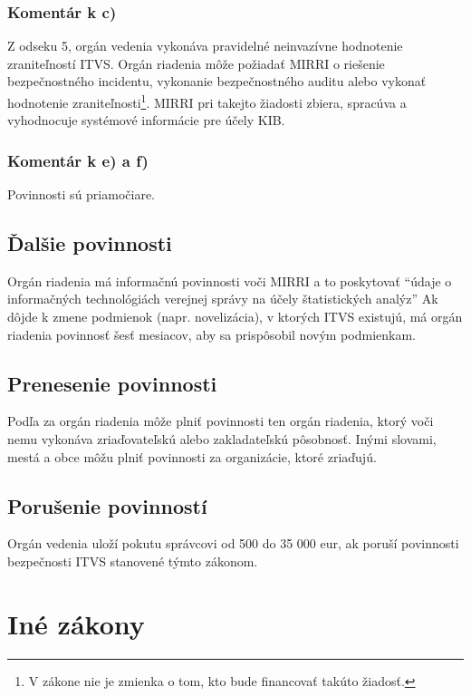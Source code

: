 \subsubsection*{Komentár k c)}
Z odseku 5, orgán vedenia vykonáva pravidelné neinvazívne hodnotenie zraniteľností \acrshort{ITVS}. Orgán riadenia môže
požiadať \acrshort{MIRRI} o riešenie bezpečnostného incidentu, vykonanie bezpečnostného auditu alebo vykonať hodnotenie
zraniteľnosti\footnote{V zákone nie je zmienka o tom, kto bude financovať takúto žiadosť.}. \acrshort{MIRRI} pri takejto
žiadosti zbiera, spracúva a vyhodnocuje systémové informácie pre účely \acrshort{KIB}.

\subsubsection*{Komentár k e) a f)}
Povinnosti sú priamočiare.

\subsection{Ďalšie povinnosti}
Orgán riadenia má informačnú povinnosti voči \acrshort{MIRRI} a to poskytovať\cite[\S 8 odsek (2)]{95/2019} \enquote{údaje o informačných
technológiách verejnej správy na účely štatistických analýz} Ak dôjde k zmene podmienok (napr. novelizácia), v ktorých 
\acrshort{ITVS} existujú, má orgán riadenia povinnosť šesť mesiacov, aby sa prispôsobil novým podmienkam.

\subsection{Prenesenie povinnosti}
Podľa\cite[\S 28, odsekov (1) a (2)]{95/2019} za orgán riadenia môže plniť povinnosti ten orgán riadenia, ktorý voči nemu
vykonáva zriaďovateľskú alebo zakladateľskú pôsobnosť. Inými slovami, mestá a obce môžu plniť povinnosti za organizácie,
ktoré zriaďujú.

\subsection{Porušenie povinností}
Orgán vedenia\cite[\S 29]{95/2019} uloží pokutu správcovi od 500 do 35 000 eur, ak poruší povinnosti bezpečnosti ITVS
stanovené týmto zákonom.

\section{Iné zákony}

